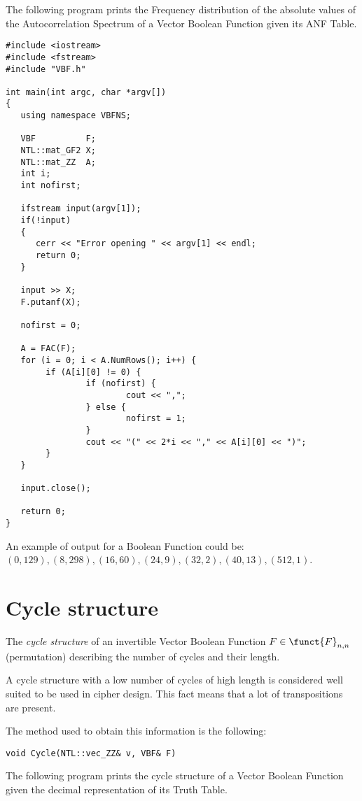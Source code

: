 The following program prints the Frequency distribution of the absolute values of the Autocorrelation Spectrum of a Vector Boolean Function given its ANF Table.

\begin{verbatim}
#include <iostream>
#include <fstream>
#include "VBF.h"

int main(int argc, char *argv[])
{
   using namespace VBFNS;

   VBF          F;
   NTL::mat_GF2 X;
   NTL::mat_ZZ  A;
   int i;
   int nofirst;

   ifstream input(argv[1]);
   if(!input)
   {
      cerr << "Error opening " << argv[1] << endl;
      return 0;
   }

   input >> X;
   F.putanf(X);

   nofirst = 0;

   A = FAC(F);
   for (i = 0; i < A.NumRows(); i++) {
        if (A[i][0] != 0) {
                if (nofirst) {
                        cout << ",";
                } else {
                        nofirst = 1;
                }
                cout << "(" << 2*i << "," << A[i][0] << ")";
        }
   }

   input.close();

   return 0;
}
\end{verbatim}

An example of output for a Boolean Function could be: $(0,129),(8,298),(16,60),(24,9),(32,2),(40,13),(512,1)$.

\section{Cycle structure}

The \textsl{cycle structure} of an invertible Vector Boolean Function $F \in \funct{F}_{n,n}$ (permutation) 
describing the number of cycles and their length.

A cycle structure with a low number of cycles of high length is considered
well suited to be used  
in cipher design. This fact means that a lot of transpositions are present.

The method used to obtain this information is the following:

\begin{verbatim}
void Cycle(NTL::vec_ZZ& v, VBF& F)
\end{verbatim}

The following program prints the cycle structure of a Vector Boolean Function given the decimal representation of its Truth Table.

